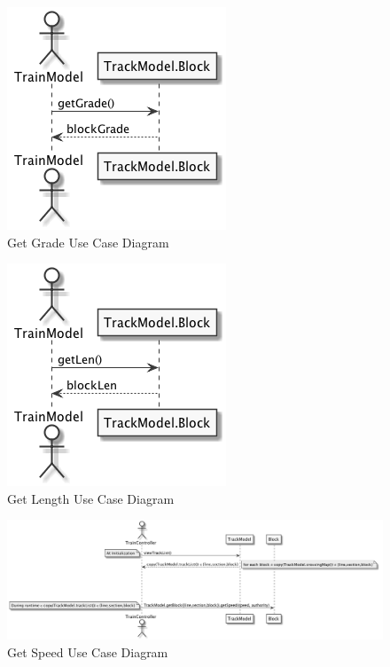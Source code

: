 \documentclass[]{article}
\begin{document}
\begin{figure}[H]
	\centering
	\includegraphics[scale=.3]{getGrade.png}
	\caption{Get Grade Use Case Diagram}
\end{figure}

\begin{figure}[H]
	\centering
	\includegraphics[scale=.3]{getLen.png}
	\caption{Get Length Use Case Diagram}
\end{figure}

\begin{figure}[H]
	\centering
	\includegraphics[scale=.3]{getSpeed.png}
	\caption{Get Speed Use Case Diagram}
\end{figure}
\end{document}
